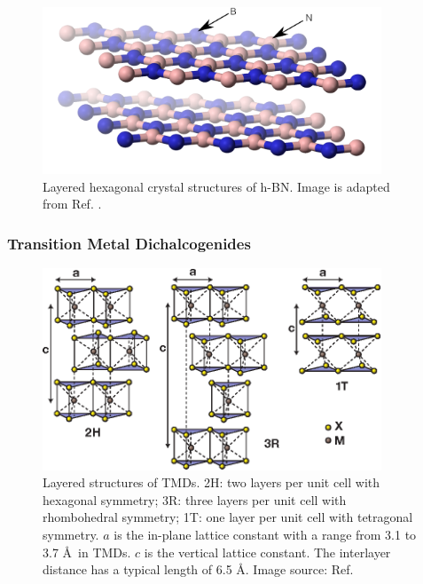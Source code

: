 \begin{figure}[htbp!] 
\centering  
\includegraphics[width=0.9\textwidth]{BN.png}
\caption[Layered hexagonal structures of h-BN]{Layered hexagonal crystal structures of h-BN. Image is adapted from Ref. \cite{Benjah2007}.}  
\label{fig:BN}
\end{figure} 


\subsubsection{Transition Metal Dichalcogenides}

\begin{figure}[htbp!] 
\centering  
\includegraphics[width=0.9\textwidth]{tmds.eps}
\caption[Layered structures of TMDs]{Layered structures of TMDs. 2H: two layers per unit cell with hexagonal symmetry; 3R: three layers per unit cell with rhombohedral symmetry; 1T: one layer per unit cell with tetragonal symmetry. $a$ is the in-plane lattice constant with a range from 3.1 to 3.7 \AA~in TMDs. $c$ is the vertical lattice constant. The interlayer distance has a typical length of 6.5 \AA. Image source: Ref. \cite{Wang2012}}  
\label{fig:tmds}
\end{figure} 

